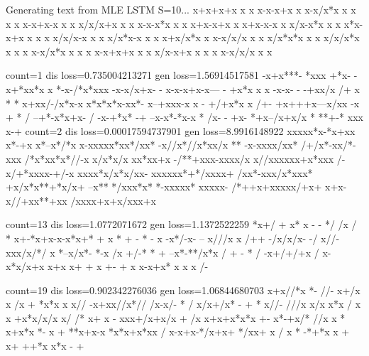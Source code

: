 Generating text from MLE LSTM S=10...
x+x+x+x x   x  
x-x-x+x x      
x-x/x*x x x x x
x-x+x-x x x    
x/x/x+x x   x  
x-x-x*x x   x  
x+x-x+x x      
x+x-x-x   x    
x/x-x*x x x    
x*x-x+x x x   x
x/x/x-x x     x
x/x*x-x x x    
x+x/x*x x      
x-x/x/x x x    
x/x*x*x x x    
x/x/x*x x x   x
x-x/x*x   x x x
x-x+x+x x x    
x/x-x+x x x x  
x-x/x/x   x x  




count=1
dis loss=0.735004213271
gen loss=1.56914517581
-x+x***- *xxx  
+*x- -x+*xx*x x
*-x-/*x*xxx    
-x-x/x+x-   -  
  x-x-x+x-x--- 
- +x*x x     x 
-x-x- - -+xx/x 
/+ x  *  *     
x+xx/-/x*x-x   
 x*x*x*x-xx*-  
x--+xxx-x x   -
 +/+x*x x  /+- 
 +x+++x---x/xx 
-x    + *  /   
 --+*-x*x+x- / 
-x-+*x* -+     
--x-x*-*x-x    
* /x- - +x-    
*+x--/x+x/x *  
**+-* xxx x-+  
count=2
dis loss=0.00017594737901
gen loss=8.9916148922
  xxxxx*x-*x+xx
x*-+x x*--x*/*x
x-xxxxx*xx*/xx*
 -x//x*//x*xx/x
 ** -x-xxxx/xx*
/+/x*-xx/*- xxx
  /*x*xx*x*//-x
x/x*x/x xx*xx+x
-/**+xxx-xxxx/x
x//xxxxxx+x*xxx
/-x/+*xxxx-+/-x
 xxxx*x/x*x/xx-
xxxxxx*+*/xxxx+
/xx*-xxx/x*xxx*
 +x/x*x**+*x/x+
 --x** */xxx*x*
*-xxxxx* xxxxx-
/*++x+xxxxx/+x+
x+x-x//+xx**+xx
/xxxx+x+x/xxx+x



count=13
dis loss=1.0772071672
gen loss=1.1372522259
*x+/  +    x*  
x      - -  */ 
 /x     / *    
x+-*x+x-x-x*x+*
+ x *   +      
-          * - 
x  -x*/-x-  -- 
  x///x x  /++ 
-/x/x/x-    -/ 
x//-xxx/x/*/  x
*--x/x*- *-x   
/x  +/-* *     
+ --x*-**/x*x /
+   -   *      
/ -x+/+/+x  /  
 x-x*x/x+x     
x+x   x+   + x 
 +-  +        x
  x-x+x*       
x x        x /-


count=19
dis loss=0.902342276036
gen loss=1.06844680703
x+x//*x   *-   
//- x+/x x /x  
+ *x*x  x x//  
-x+xx//x*//    
/x-x/-  * /    
x/x+/x* - +   *
x//- ///x      
x/x x*x / x  x 
+x*x/x/x     x/
/* x+  x      -
xxx+/x+x/x    +
/x x+x+x*x*x +-
x*-+x/* //x x *
x+x*x *-  x +  
 **x+x-x       
*x*x+x*xx /    
x-x+x-*/x+x+   
*/xx+ x /  x * 
-*+*x x + x+   
++*x x*x   - + 
